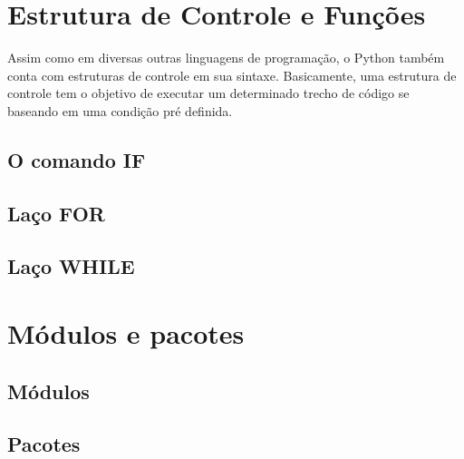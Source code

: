     \section{Estrutura de Controle e Fun\c{c}\~{o}es}
Assim como em diversas outras linguagens de programação, o Python também conta com estruturas de controle em sua sintaxe. Basicamente, uma estrutura de controle tem o objetivo de executar um determinado trecho de código se baseando em uma condição pré definida.  

            \subsection{O comando IF}


            \subsection{La\c{c}o FOR}

            \subsection{La\c{c}o WHILE}


    \section{M\'{o}dulos e pacotes}



            \subsection{M\'{o}dulos}



            \subsection{Pacotes}






